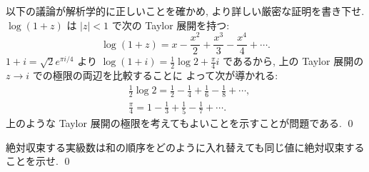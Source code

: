 \documentclass[12pt,twoside]{jarticle}
\begin{document}
\begin{question}[30点]
 以下の議論が解析学的に正しいことを確かめ, 
 より詳しい厳密な証明を書き下せ.
 $\log(1+z)$ は $|z|<1$ で次の Taylor 展開を持つ:
 \begin{equation*}
  \log(1+z) = x - \frac{x^2}{2} + \frac{x^3}{3} - \frac{x^4}{4} + \cdots.
 \end{equation*}
 $1+i=\sqrt{2}e^{\pi i/4}$ より $\log(1+i)=\frac{1}{2}\log 2 + \frac{\pi}{4}i$ 
 であるから, 上の Taylor 展開の $z\to i$ での極限の両辺を比較することに
 よって次が導かれる:
 \begin{align*}
  &
  \frac{1}{2}\log 2 = \frac{1}{2} - \frac{1}{4} + \frac{1}{6} - \frac{1}{8} + \cdots,
  \\ &
  \frac{\pi}{4} = 1 - \frac{1}{3} + \frac{1}{5} - \frac{1}{7} + \cdots.
 \end{align*}
 上のような Taylor 展開の極限を考えてもよいことを示すことが問題である.
 \qed
\end{question}

\begin{question}
\label{q:abs-conv-1}
 絶対収束する実級数は和の順序をどのように入れ替えても同じ値に絶対収束する
 ことを示せ. \qed
\end{question}
\end{document}
